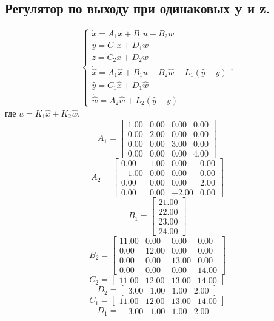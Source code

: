 \subsection{Регулятор по выходу при одинаковых y и z.}

\[
    \begin{cases}
        \dot{x} = A_1x + B_1u + B_2w \\
        y = C_1x + D_1w \\
        z = C_2x + D_2w \\
        \dot{\hat{x}} = A_1\hat{x} + B_1u + B_2\hat{w} + L_1(\hat{y} - y) \\
        \hat{y} = C_1\hat{x} + D_1\hat{w} \\
        \dot{\hat{w}} = A_2\hat{w} + L_2(\hat{y} - y)
    \end{cases},
\]
где $u = K_1\hat{x} + K_2\hat{w}$. 
\[A_1 = \begin{bmatrix}
    1.00 &  0.00 &  0.00 &  0.00\\
    0.00 &  2.00 &  0.00 &  0.00\\
    0.00 &  0.00 &  3.00 &  0.00\\
    0.00 &  0.00 &  0.00 &  4.00
  \end{bmatrix}\]
  \[A_2 = \begin{bmatrix}
    0.00 &  1.00 &  0.00 &  0.00\\
   -1.00 &  0.00 &  0.00 &  0.00\\
    0.00 &  0.00 &  0.00 &  2.00\\
    0.00 &  0.00 & -2.00 &  0.00
  \end{bmatrix}\]
  \[B_1 = \begin{bmatrix}
    21.00\\
    22.00\\
    23.00\\
    24.00
  \end{bmatrix}\]
  \[B_2 = \begin{bmatrix}
    11.00 &  0.00 &  0.00 &  0.00\\
    0.00 &  12.00 &  0.00 &  0.00\\
    0.00 &  0.00 &  13.00 &  0.00\\
    0.00 &  0.00 &  0.00 &  14.00
  \end{bmatrix}\]
  \[C_2 = \begin{bmatrix}
    11.00 &  12.00 &  13.00 &  14.00
  \end{bmatrix}\]
  \[D_2 = \begin{bmatrix}
    3.00 &  1.00 &  1.00 &  2.00
  \end{bmatrix}\]
  \[C_1 = \begin{bmatrix}
    11.00 &  12.00 &  13.00 &  14.00
  \end{bmatrix}\]
  \[D_1 = \begin{bmatrix}
    3.00 &  1.00 &  1.00 &  2.00
  \end{bmatrix}\]
  
